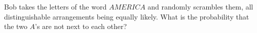Bob takes the letters of the word $AMERICA$ and randomly scrambles them, all distinguishable arrangements being equally likely. What is the probability that the two $A$'s are not next to each other?
